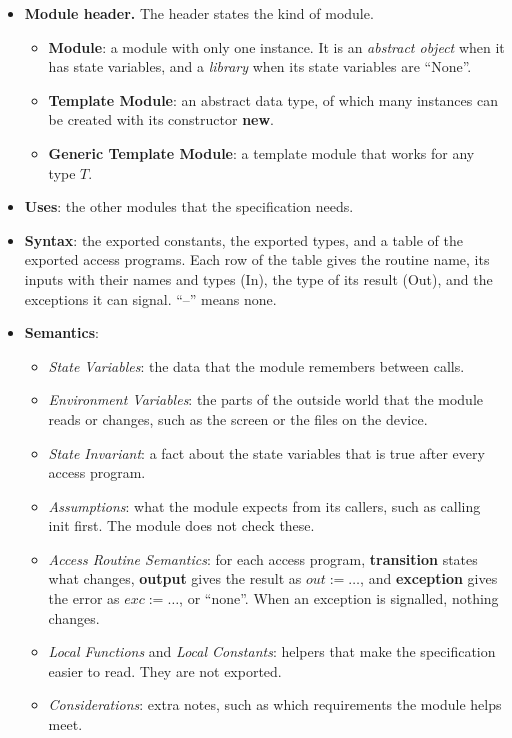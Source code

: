 \documentclass[10pt, titlepage]{article}
\newcommand{\out}{\mathit{out}}
\newcommand{\exc}{\mathit{exc}}
\begin{document}
\begin{itemize}
\item \textbf{Module header.} The header states the kind of module.
  \begin{itemize}
  \item \textbf{Module}: a module with only one instance. It is an
    \emph{abstract object} when it has state variables, and a \emph{library}
    when its state variables are ``None''.
  \item \textbf{Template Module}: an abstract data type, of which many
    instances can be created with its constructor \textbf{new}.
  \item \textbf{Generic Template Module}: a template module that works for
    any type $T$.
  \end{itemize}
\item \textbf{Uses}: the other modules that the specification needs.
\item \textbf{Syntax}: the exported constants, the exported types, and a table
  of the exported access programs. Each row of the table gives the routine
  name, its inputs with their names and types (In), the type of its result
  (Out), and the exceptions it can signal. ``--'' means none.
\item \textbf{Semantics}:
  \begin{itemize}
  \item \emph{State Variables}: the data that the module remembers between
    calls.
  \item \emph{Environment Variables}: the parts of the outside world that the
    module reads or changes, such as the screen or the files on the device.
  \item \emph{State Invariant}: a fact about the state variables that is true
    after every access program.
  \item \emph{Assumptions}: what the module expects from its callers, such as
    calling init first. The module does not check these.
  \item \emph{Access Routine Semantics}: for each access program,
    \textbf{transition} states what changes, \textbf{output} gives the result
    as $\out := \ldots$, and \textbf{exception} gives the error as $\exc :=
    \ldots$, or ``none''. When an exception is signalled, nothing changes.
  \item \emph{Local Functions} and \emph{Local Constants}: helpers that make the
    specification easier to read. They are not exported.
  \item \emph{Considerations}: extra notes, such as which requirements the
    module helps meet.
  \end{itemize}
\end{itemize}
\end{document}
